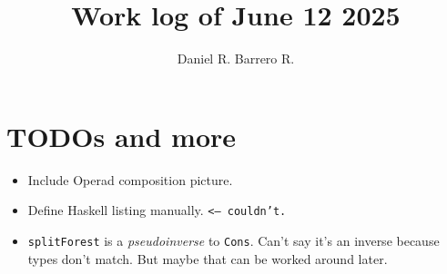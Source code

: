 \documentclass{amsart}
\title{Work log of June 12 2025}
\author{Daniel R. Barrero R.}
\begin{document}
\maketitle

\section{TODOs and more}

\begin{itemize}
	\item Include Operad composition picture.
	\item Define Haskell listing manually. \texttt{<-- couldn't.}
	\item \texttt{splitForest} is a \emph{pseudoinverse} to \texttt{Cons}.
		Can't say it's an inverse because types don't match. But maybe
		that can be worked around later.
\end{itemize}

\newpage


\end{document}
